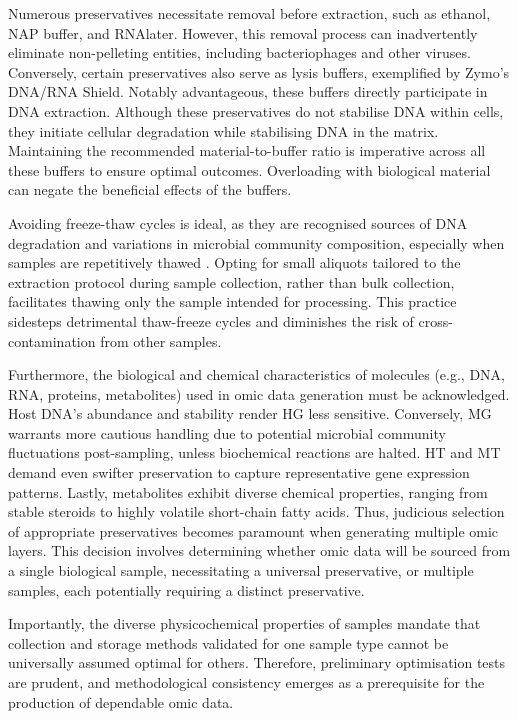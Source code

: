 \documentclass[
]{book}
\begin{document}
Numerous preservatives necessitate removal before extraction, such as ethanol, NAP buffer, and RNAlater. However, this removal process can inadvertently eliminate non-pelleting entities, including bacteriophages and other viruses. Conversely, certain preservatives also serve as lysis buffers, exemplified by Zymo's DNA/RNA Shield. Notably advantageous, these buffers directly participate in DNA extraction. Although these preservatives do not stabilise DNA within cells, they initiate cellular degradation while stabilising DNA in the matrix. Maintaining the recommended material-to-buffer ratio is imperative across all these buffers to ensure optimal outcomes. Overloading with biological material can negate the beneficial effects of the buffers.

Avoiding freeze-thaw cycles is ideal, as they are recognised sources of DNA degradation and variations in microbial community composition, especially when samples are repetitively thawed \citep{Cuthbertson2015-uy}. Opting for small aliquots tailored to the extraction protocol during sample collection, rather than bulk collection, facilitates thawing only the sample intended for processing. This practice sidesteps detrimental thaw-freeze cycles and diminishes the risk of cross-contamination from other samples.

Furthermore, the biological and chemical characteristics of molecules (e.g., DNA, RNA, proteins, metabolites) used in omic data generation must be acknowledged. Host DNA's abundance and stability render HG less sensitive. Conversely, MG warrants more cautious handling due to potential microbial community fluctuations post-sampling, unless biochemical reactions are halted. HT and MT demand even swifter preservation to capture representative gene expression patterns. Lastly, metabolites exhibit diverse chemical properties, ranging from stable steroids to highly volatile short-chain fatty acids. Thus, judicious selection of appropriate preservatives becomes paramount when generating multiple omic layers. This decision involves determining whether omic data will be sourced from a single biological sample, necessitating a universal preservative, or multiple samples, each potentially requiring a distinct preservative.

Importantly, the diverse physicochemical properties of samples mandate that collection and storage methods validated for one sample type cannot be universally assumed optimal for others. Therefore, preliminary optimisation tests are prudent, and methodological consistency emerges as a prerequisite for the production of dependable omic data.
\end{document}
